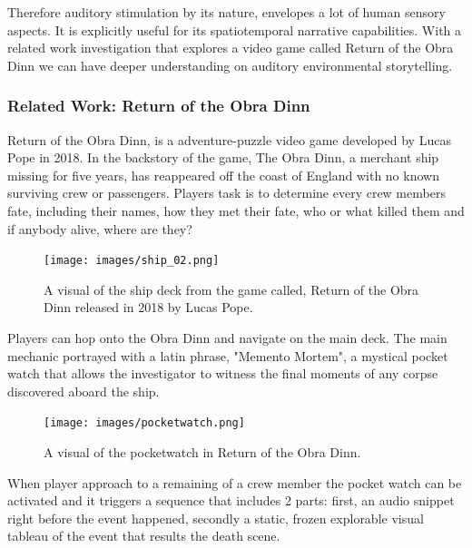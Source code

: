             Therefore auditory stimulation by its nature, envelopes a lot of human sensory aspects. It is explicitly useful for its spatiotemporal narrative capabilities. With a related work investigation that explores a video game called Return of the Obra Dinn we can have deeper understanding on auditory environmental storytelling.\par
        \subsubsection{Related Work: Return of the Obra Dinn}
            Return of the Obra Dinn, is a adventure-puzzle video game developed by Lucas Pope in 2018. In the backstory of the game, The Obra Dinn, a merchant ship missing for five years, has reappeared off the coast of England with no known surviving crew or passengers. Players task is to determine every crew members fate, including their names, how they met their fate, who or what killed them and if anybody alive, where are they?\par

            \begin{figure}[H]
                \centering
                \texttt{[image: images/ship\_02.png]}
                \caption{A visual of the ship deck from the game called, Return of the Obra Dinn released in 2018 by Lucas Pope.}
                \label{fig:SHIP}
            \end{figure}

            Players can hop onto the Obra Dinn and navigate on the main deck. The main mechanic portrayed with a latin phrase, "Memento Mortem", a mystical pocket watch that allows the investigator to witness the final moments of any corpse discovered aboard the ship.\par 

            \begin{figure}[H]
                \centering
                \texttt{[image: images/pocketwatch.png]}
                \caption{A visual of the pocketwatch in Return of the Obra Dinn.}
                \label{fig:POCKETWATCH}
            \end{figure}

            When player approach to a remaining of a crew member the pocket watch can be activated and it triggers a sequence that includes 2 parts: first, an audio snippet right before the event happened, secondly a static, frozen explorable visual tableau of the event that results the death scene.\par


